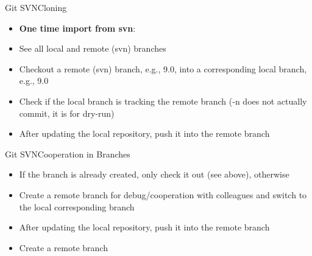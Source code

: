 \begin{frame}{Git SVN}{Cloning}
  \begin{itemize}
    \item \textbf{One time import from svn}:
    \item See all local and remote (svn) branches
    \item  Checkout a remote (svn) branch, e.g., 9.0, into a corresponding local branch, e.g., 9.0
  \item Check if the local branch is tracking the remote branch
   (-n does not actually commit, it is for dry-run)
  \item After updating the local repository, push it into the remote branch
  \end{itemize}
\end{frame}

\begin{frame}{Git SVN}{Cooperation in Branches}
  \begin{itemize}
    \item If the branch is already created, only check it out (see above), otherwise
    \item Create a remote branch for debug/cooperation with colleagues and switch to the local corresponding branch
  \item After updating the local repository, push it into the remote branch
\item Create a remote branch 
  \end{itemize}
\end{frame}

